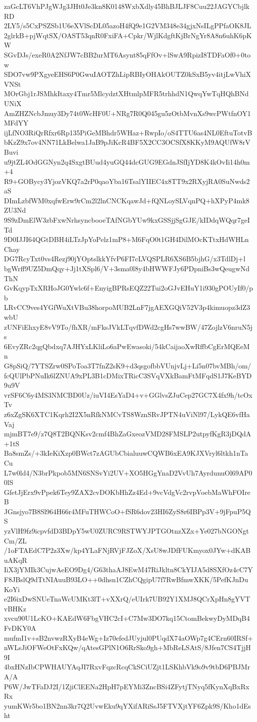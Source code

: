 zaGcLT6VhPJgWJg3JHt0Je3kn8K0148WxbXdly45BhBJLJF8Cuu22JAGYCbjlkRD
2LY5/s5CxPSZSb1U6eXVlScDL05azoH4fQ9e1G2VM348e34gjxNsILgPPfaOK8JL
2glrkB+pjWqtSX/OAST53qnR0FxiFA+Cpkr/WjlKdgftKjBrNgYr8A8n6uhK6pKW
SGvDJs/exeR0A2NfJW7cBB2urMT6Asynt85qFfOv+lSwA9RpizI8TDFaOf0+0tow
SDO7vw9PXgyeEHS6P0GwuIAOTZhLipRBIyOHAkOUTZ0kSxB5yv4itjLwVhiXVNSt
MOrGbj1rJSMhkItaxy4Tmr5MlcydztXHtmlpMFR5trhhdN1QwqYwTqHQhBNdUNiX
AmZHZNcbJmuy3Dy74t0WcHF0U+NRg7R0Q045gu5zOtbMvnXs9wcPWtfnOY1MFdYY
ijLfNO3RiQrRfxr6Rp135PiGeMBhdr5WHaz+RwpIo/oS4TTU6as4NL0EftuTotvB
bKzZ9x7ov4NN71LkBelwa1JaB9pJiKcR4BF5X2CC3OCSfX8KKyM9AQUfW8rVBuvi
u9jtZL4OdGGNyn2q4SxgtBUud4yuGQ44dcGUG9EGdnJSfIjYD8K4kOvIi14h0m+4
R9+GOBycy3YjozVKQ7a2rP0qaoYba16TsalYIIEC4x8TT9x2RXyjRA0SuNwds2aS
DImLzbfWM0xqfwErw9rCm2l2lnCNCKqawJd+fQNLoySLVqnPQ+hXPyP4mk8ZU3Nd
9S9zDmElW3zbFxwNrhsyncbooeTAfNGbYUw9kxGSSjjSgGJE/kIDdqWQqr7geITd
9D0IJJI64QGtDBH4iLTzJpYoPelz1mP8+M6FqO0t1GH4DilMOcKTtxHdWHLnChay
DG7RcyTxt0vs4Rezj90jYOptslkkYfvP6FI7cLVQSPLR6XS6B5bjhG/x3TdlDj+l
bgWrff9UZ5DmQqy+Jj1tXSpl6/V+3sma0l8y4bHWWFJy6PDpniBs3wQeugwNdThN
GvKqypTxXRHoJG0Ywlc6f+EnyigBPRsEQZ22Tui2oGJvEHuY1i930gPOUyIf0/pb
LRvCC9ves4YGfWuXtVBu38horpoMUB2LnF7jgAEXGQiV52V3p4kimuopz3dZ3wbU
zUNFiEhxyE8vV9To/fhXR/mFksJVkLTqvfDWd2cgHs7wwBW/47ZojlzV6nruN5js
6EvyZRc2qgQbdxq7AJHYxLKliLo6aPwEwasoki/54kCaijaoXwRffbCgErMQEeMn
G8pSiQ/7YTSZrw0SPoToa3T7fnZ2sK9+d3qsgofbbVUnjvLj+Li5n07bvMBh/om/
fcQUlPbPNuIk6lZNUA9xPL3B1cDMixTRicC3SVqVXkBamFtMFqdS1J7KeBYD9u9V
vrSF6C6y4MS3NMCBD0Uz/iuVI4EsYaD4+v+GGlvsZJuCep27GC7X4fx9h/tcOxTv
z6xZgSK6XTC1Kqrh2I2X5nRfkNMCvTS8WznSRvJPTN4uViNl97/LykQE6vfHaVaj
mjmBT7e9/z7Q8T2BQNKsv2cmf4BhZaGxeozVMD28FMSLP2utpyfKgR3jDQdA+1tS
Ba8smZs/+3kIeKiXzp0BWct7zAGUbCbialuuwCQWB6xEA9KJXVryl6ltkh1nTaCu
L7w0ld4/N3brPkpob5MN6SNSvYi2UV+XO5HGgYnaD2VvUh7AyrdunuOl69AP00lS
GfetJjErx9vPpek6Tey9ZAX2cvDOKbHhZz4Ed+9vcVdgVc2rvpVoebMaWhFOIreB
JGnsjyo7B8Sl964H66r4MFuTHWCoO+fSR6dov23HI6ZyS8r6IBPp3V+9jFpuP5QS
yzVlH9fz9icpvfdD3BDpY5wU0ZURC9RSTWYJPTGOtnzXZx+Ye027bNGONgtCm/ZL
/1oFTAEdC7P2z3Xw/kp4YLaFNjRVjFJZoX/XsU8wJDfFUKmyox0JYw+dKABuAKqR
IiX3jYMIk3CujwAeEO9Dg4/G63thaAJ8EwM47RiJkltn8CkYIJA5d8SXfOz4cC7Y
F8JBslQ9dTtNIAuuB93LO++0dhsn1CZhCQgipU7f7RwBfmwXKK/5PefKJnDuKoYi
e2I6ixDwSNUeTnaWcUMKt3lT+vXXrQ/eUIrk7UB92Y1XMJ8QCrXpHn8gYVTvBHKz
xvcu90U1LcKO+KAEdW6FbgVHC2cI+C7Mw3DO7kq15CtomBekwyDyMDqB4FvDKY0A
mufmI1v+sB2nvwzRXyB4eWg+Iz70efedJUyjul0PUqdX74aOWp7g4CErn60IRSf+
nWLsJiOFWeOtFxKQw/qAtesGPlN1O6RrSko9gh+MbReLSAtS/8Jfen7CS4TjjH9I
4bxHNzIbCPWHAUYAqJI7RxvFqzcRcqCkSCiUZjt1LSKhbVk9o9v9tbD6PBJMrA/A
P6W/JwTFaDJ2I/1ZjiClEENa2HpH7pEYMi3ZncBSi4ZFytjTNyq5fKynXqBxRxRx
yumKWr5bo1BN2nn3kr7Q2UvwEku9qYXifARiSsJ5FTVXjtYF6Zpk9S/Kho1dEsht
